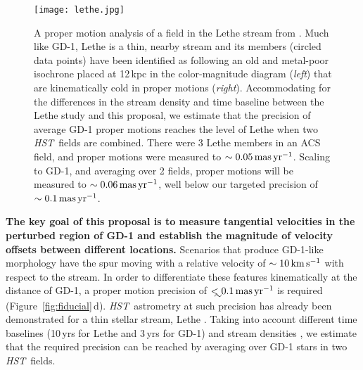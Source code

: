 \documentclass[12pt]{article}
\newcommand{\hst}{\textsl{HST}}
\begin{document}
\begin{figure}
\begin{center}
\texttt{[image: lethe.jpg]}
\end{center}
\caption{
A proper motion analysis of a field in the Lethe stream from \textcite{sohn2016}.
Much like GD-1, Lethe is a thin, nearby stream and its members (circled data points) have been identified as following an old and metal-poor isochrone placed at 12\,kpc in the color-magnitude diagram (\emph{left}) that are kinematically cold in proper motions (\emph{right}).
Accommodating for the differences in the stream density and time baseline between the Lethe study and this proposal, we estimate that the precision of average GD-1 proper motions reaches the level of Lethe when two \hst\ fields are combined.
There were 3 Lethe members in an ACS field, and proper motions were measured to $\sim0.05\,\rm mas\,yr^{-1}$.
Scaling to GD-1, and averaging over 2 fields, proper motions will be measured to $\sim0.06\,\rm mas\,yr^{-1}$, well below our targeted precision of $\sim0.1\,\rm mas\,yr^{-1}$.
}
\label{fig:lethe}
\end{figure}

{\bf The key goal of this proposal is to measure tangential velocities in the perturbed region of GD-1 and establish the magnitude of velocity offsets between different locations.}
Scenarios that produce GD-1-like morphology have the spur moving with a relative velocity of $\sim10\,\rm km\,s^{-1}$ with respect to the stream.
In order to differentiate these features kinematically at the distance of GD-1, a proper motion precision of $\lesssim0.1\,\rm mas\,yr^{-1}$ is required (Figure~\ref{fig:fiducial}\,d).
\hst\ astrometry at such precision has already been demonstrated for a thin stellar stream, Lethe \parencite[Figure~\ref{fig:lethe}, $\sigma_\mu\sim0.05\,\rm mas\,yr^{-1}$;][]{sohn2016}.
Taking into account different time baselines (10\,yrs for Lethe and 3\,yrs for GD-1) and stream densities \parencite[GD-1 is $\sim$ twice as dense;][]{grillmair2006, grillmair2009}, we estimate that the required precision can be reached by averaging over GD-1 stars in two \hst\ fields.
\end{document}
